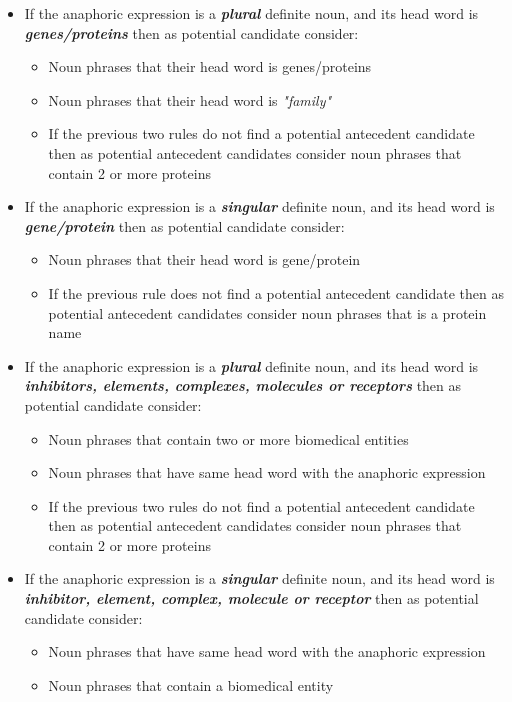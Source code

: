 \begin{itemize}
	\item If the anaphoric expression is a \emph{\textbf{plural}} definite noun, and its head word is \emph{\textbf{genes/proteins}} then as potential candidate consider:
	\begin{itemize}
		\item Noun phrases that their head word is genes/proteins 
		\item Noun phrases that their head word is \emph{"family"}
		\item If the previous two rules do not find a potential antecedent candidate then as potential antecedent candidates consider noun phrases that contain 2 or more proteins 
	\end{itemize}
	\item If the anaphoric expression is a \emph{\textbf{singular}} definite noun, and its head word is \emph{\textbf{gene/protein}} then as potential candidate consider:
	\begin{itemize}
		\item Noun phrases that their head word is gene/protein
		\item If the previous rule does not find a potential antecedent candidate then as potential antecedent candidates consider noun phrases that is a protein name 
	\end{itemize}
	\item If the anaphoric expression is a \emph{\textbf{plural}} definite noun, and its head word is \emph{\textbf{inhibitors, elements, complexes, molecules or receptors }} then as potential candidate consider:
	\begin{itemize}
		\item Noun phrases that contain two or more biomedical entities
		\item Noun phrases that have same head word with the anaphoric expression
		\item If the previous two rules do not find a potential antecedent candidate then as potential antecedent candidates consider noun phrases that contain 2 or more proteins 
	\end{itemize}
	\item If the anaphoric expression is a \emph{\textbf{singular}} definite noun, and its head word is \emph{\textbf{inhibitor, element, complex, molecule or receptor }} then as potential candidate consider:
	\begin{itemize}
		\item Noun phrases that have same head word with the anaphoric expression
		\item Noun phrases that contain a biomedical entity
	\end{itemize}
\end{itemize}

